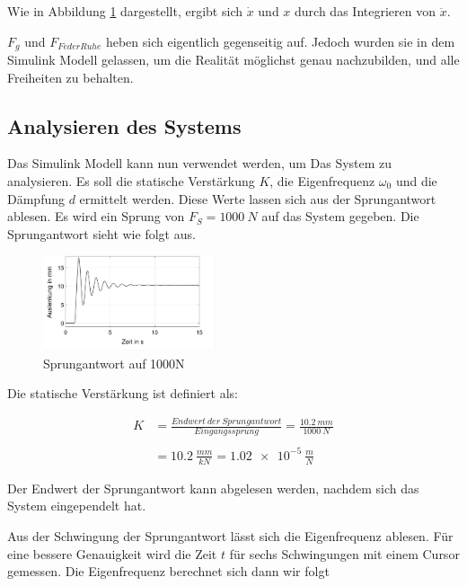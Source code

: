 Wie in Abbildung \ref{SimulinkStreckenModell} dargestellt, ergibt sich $\dot{x}$ und $x$ durch das Integrieren von $\ddot{x}$.



$F_{g}$ und $F_{FederRuhe}$ heben sich eigentlich gegenseitig auf. Jedoch wurden sie in dem Simulink Modell gelassen,
um die Realität möglichst genau nachzubilden, und alle Freiheiten zu behalten.

\subsection{Analysieren des Systems}
Das Simulink Modell kann nun verwendet werden, um Das System zu analysieren.
Es soll die statische Verstärkung $K$, die Eigenfrequenz $\omega_{0}$ und die Dämpfung $d$ ermittelt werden.
Diese Werte lassen sich aus der Sprungantwort ablesen. Es wird ein Sprung von $F_{S} = \SI{1000}{N}$ 
auf das System gegeben. Die Sprungantwort sieht wie folgt aus.

\begin{figure}[h] 
	\centering
		\includegraphics[width=0.45\textwidth]{Bilder/Stepresponse1000N.png}
	\caption{Sprungantwort auf 1000N}
	\label{SimulinkStreckenModell}
\end{figure}


Die statische Verstärkung ist definiert als: 

\begin{equation}
	\begin{split}
		K &=  \frac{Endwert ~ der ~ Sprungantwort}{Eingangssprung} = \frac{\SI{10,2}{mm}}{\SI{1000}{N}} \\
		\\
		&= \SI{10,2}{\frac{mm}{kN}} = \SI{1,02e-5}{ \frac{m}{N}}
		\label{eq:statischeVerstaerkung}
	\end{split}
\end{equation}


Der Endwert der Sprungantwort kann abgelesen werden, nachdem sich das System eingependelt hat.

Aus der Schwingung der Sprungantwort lässt sich die Eigenfrequenz ablesen. Für eine bessere Genauigkeit wird die Zeit $t$ für 
sechs Schwingungen mit einem Cursor gemessen. Die Eigenfrequenz berechnet sich dann wir folgt

